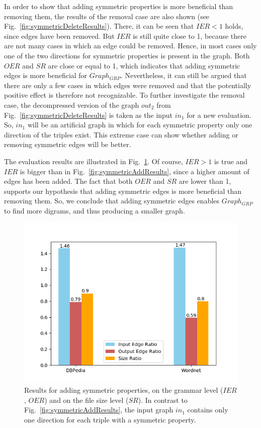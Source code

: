In order to show that adding symmetric properties is more beneficial than removing them, the results of the removal case are also shown (see Fig.~\ref{fig:symmetricDeleteResults}). There, it can be seen that $IER<1$ holds, since edges have been removed. But $IER$ is still quite close to 1, because there are not many cases in which an edge could be removed. Hence, in most cases only one of the two directions for symmetric properties is present in the graph. Both $OER$ and $SR$ are close or equal to 1, which indicates that adding symmetric edges is more beneficial for $Graph_{GRP}$. Nevertheless, it can still be argued that there are only a few cases in which edges were removed and that the potentially positive effect is therefore not recognizable. To further investigate the removal case, the decompressed version of the graph $out_2$ from Fig.~\ref{fig:symmetricDeleteResults} is taken as the input $in_1$ for a new evaluation. So, $in_1$ will be an artificial graph in which for each symmetric property only one direction of the triples exist. This extreme case can show whether adding or removing symmetric edges will be better.



The evaluation results are illustrated in Fig.~\ref{fig:symmetricAddResults2}. Of course, $IER>1$ is true and $IER$ is bigger than in Fig.~\ref{fig:symmetricAddResults}, since a higher amount of edges has been added. The fact that both $OER$ and $SR$ are lower than 1, supports our hypothesis that adding symmetric edges is more beneficial than removing them. So, we conclude that adding symmetric edges enables $Graph_{GRP}$ to find more digrams, and thus producing a smaller graph.

\begin{figure}
	\centering
	\includegraphics[width=0.6\linewidth]{figures/4_evaluation/ontology/ratiosSymmetricsAdd2}
	\caption{Results for adding symmetric properties, on the grammar level ($IER$, $OER$) and on the file size level ($SR$). In contrast to Fig.~\ref{fig:symmetricAddResults}, the input graph $in_1$ contains only one direction for each triple with a symmetric property.}
	\label{fig:symmetricAddResults2}
\end{figure}

